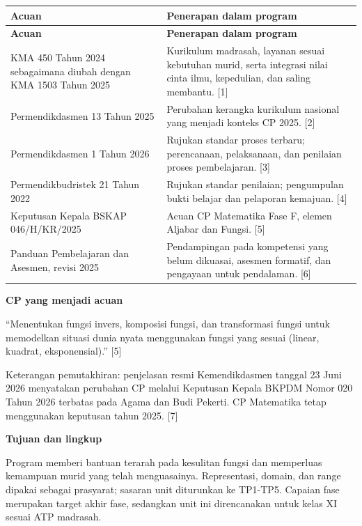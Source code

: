 \documentclass[11pt,a4paper]{article}
\begin{document}
{\small\setlength{\tabcolsep}{2mm}\renewcommand{\arraystretch}{1.35}\begin{longtable}{|>{\raggedright\arraybackslash}p{60.554mm}|>{\raggedright\arraybackslash}p{108.996mm}|}\hline
\rowcolor{gray!10}\textbf{Acuan} & \textbf{Penerapan dalam program}\\ \hline
\endfirsthead
\rowcolor{gray!10}\textbf{Acuan} & \textbf{Penerapan dalam program}\\ \hline
\endhead
KMA 450 Tahun 2024 sebagaimana diubah dengan KMA 1503 Tahun 2025 & Kurikulum madrasah, layanan sesuai kebutuhan murid, serta integrasi nilai cinta ilmu, kepedulian, dan saling membantu. [1]\\ \hline
Permendikdasmen 13 Tahun 2025 & Perubahan kerangka kurikulum nasional yang menjadi konteks CP 2025. [2]\\ \hline
Permendikdasmen 1 Tahun 2026 & Rujukan standar proses terbaru; perencanaan, pelaksanaan, dan penilaian proses pembelajaran. [3]\\ \hline
Permendikbudristek 21 Tahun 2022 & Rujukan standar penilaian; pengumpulan bukti belajar dan pelaporan kemajuan. [4]\\ \hline
Keputusan Kepala BSKAP 046/H/KR/2025 & Acuan CP Matematika Fase F, elemen Aljabar dan Fungsi. [5]\\ \hline
Panduan Pembelajaran dan Asesmen, revisi 2025 & Pendampingan pada kompetensi yang belum dikuasai, asesmen formatif, dan pengayaan untuk pendalaman. [6]\\ \hline
\end{longtable}}\medskip
\par\medskip\noindent\textbf{CP yang menjadi acuan}\par\smallskip
“Menentukan fungsi invers, komposisi fungsi, dan transformasi fungsi untuk memodelkan situasi dunia nyata menggunakan fungsi yang sesuai (linear, kuadrat, eksponensial).” [5]\par\medskip
{\small Keterangan pemutakhiran: penjelasan resmi Kemendikdasmen tanggal 23 Juni 2026 menyatakan perubahan CP melalui Keputusan Kepala BKPDM Nomor 020 Tahun 2026 terbatas pada Agama dan Budi Pekerti. CP Matematika tetap menggunakan keputusan tahun 2025. [7]\par}\medskip
\par\medskip\noindent\textbf{Tujuan dan lingkup}\par\smallskip
Program memberi bantuan terarah pada kesulitan fungsi dan memperluas kemampuan murid yang telah menguasainya. Representasi, domain, dan range dipakai sebagai prasyarat; sasaran unit diturunkan ke TP1-TP5. Capaian fase merupakan target akhir fase, sedangkan unit ini direncanakan untuk kelas XI sesuai ATP madrasah.\par\medskip
\end{document}
